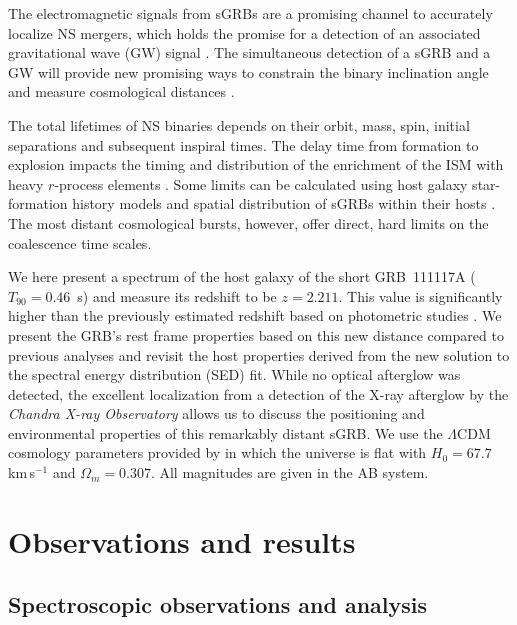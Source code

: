\documentclass{aa}    %
\begin{document}
The electromagnetic signals from sGRBs are a promising channel to accurately
localize NS mergers, which holds the promise for a detection of an associated
gravitational wave (GW) signal \citep{Ghirlanda2016}. The simultaneous detection
of a sGRB and a GW will provide new promising ways to constrain the binary
inclination angle \citep{Arun2014} and measure cosmological distances
\citep{Nissanke2010}.

The total lifetimes of NS binaries depends on their orbit, mass, spin, initial
separations and subsequent inspiral times. The delay time from formation to
explosion impacts the timing and distribution of the enrichment of the ISM with
heavy $r$-process elements \citep{VandeVoort2015, Wallner2015,  Ji2016}. Some
limits can be calculated using host galaxy star-formation history models and
spatial distribution of sGRBs within their hosts \citep[][]{Berger2014}. The
most distant cosmological bursts, however, offer direct, hard limits on the
coalescence time scales.


We here present a spectrum of the host galaxy of the short
GRB~111117A ($T_{90}=0.46$~s) and measure its redshift to be $z=2.211$. This
value is significantly higher than the previously estimated redshift based on
photometric studies \citep{Margutti2012,Sakamoto2013}. We present the GRB's rest
frame properties based on this new distance compared to previous analyses and
revisit the host properties derived from the new solution to the spectral energy distribution (SED) fit.
While no optical afterglow was detected, the excellent localization from a
detection of the X-ray afterglow by the \emph{Chandra X-ray Observatory}
allows us to discuss the positioning and environmental properties of this
remarkably distant sGRB.
We use the $\Lambda$CDM cosmology parameters provided by
\citet{Planck2015} in which the universe is flat with $H_0 = 67.7$\,km\,s$^{-1}$
and $\Omega_m = 0.307$. All magnitudes are given in the AB system.


\section{Observations and results}

\subsection{Spectroscopic observations and analysis}
\end{document}
